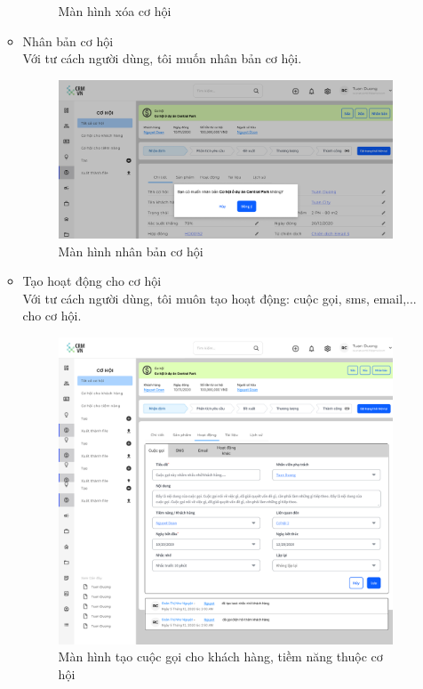 \documentclass[12pt,a4paper]{article}
\begin{document}
\begin{enumerate}
\begin{itemize}
\begin{figure}[H]
                \vspace{0.5cm}
                \caption{Màn hình xóa cơ hội }
                \label{xoacohoi}
            \end{figure}
            \item Nhân bản cơ hội \\
            Với tư cách người dùng, tôi muốn nhân bản cơ hội.
            \begin{figure}[H]
                \centering \includegraphics[width=\textwidth]{Img/Nguyet/Cohoi/nhanbaocohoi.png}
                \vspace{0.5cm}
                \caption{Màn hình nhân bản cơ hội }
                \label{nhanbancohoi}
            \end{figure}
            \item Tạo hoạt động cho cơ hội \\
            Với tư cách người dùng, tôi muôn tạo hoạt động: cuộc gọi, sms, email,... cho cơ hội.
            \begin{figure}[H]
                \centering \includegraphics[width=\textwidth]{Img/Nguyet/Cohoi/cuocgoicohoi.png}
                \vspace{0.5cm}
                \caption{Màn hình tạo cuộc gọi cho khách hàng, tiềm năng thuộc cơ hội }
                \label{cuocgoicohoi}
            \end{figure}


\end{itemize}
\end{enumerate}
\end{document}
